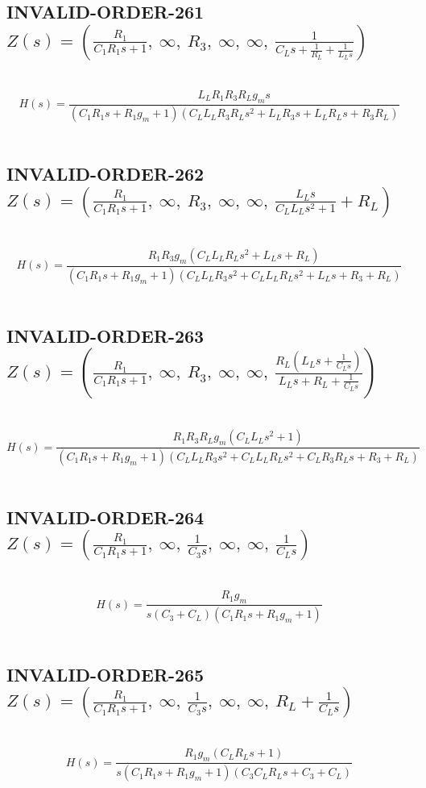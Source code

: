 \documentclass{article}
\begin{document}
\subsection{INVALID-ORDER-261 $Z(s) = \left( \frac{R_{1}}{C_{1} R_{1} s + 1}, \  \infty, \  R_{3}, \  \infty, \  \infty, \  \frac{1}{C_{L} s + \frac{1}{R_{L}} + \frac{1}{L_{L} s}}\right)$ } \ 
\textbf{\[H(s) = \frac{L_{L} R_{1} R_{3} R_{L} g_{m} s}{\left(C_{1} R_{1} s + R_{1} g_{m} + 1\right) \left(C_{L} L_{L} R_{3} R_{L} s^{2} + L_{L} R_{3} s + L_{L} R_{L} s + R_{3} R_{L}\right)}\] } \ 
\subsection{INVALID-ORDER-262 $Z(s) = \left( \frac{R_{1}}{C_{1} R_{1} s + 1}, \  \infty, \  R_{3}, \  \infty, \  \infty, \  \frac{L_{L} s}{C_{L} L_{L} s^{2} + 1} + R_{L}\right)$ } \ 
\textbf{\[H(s) = \frac{R_{1} R_{3} g_{m} \left(C_{L} L_{L} R_{L} s^{2} + L_{L} s + R_{L}\right)}{\left(C_{1} R_{1} s + R_{1} g_{m} + 1\right) \left(C_{L} L_{L} R_{3} s^{2} + C_{L} L_{L} R_{L} s^{2} + L_{L} s + R_{3} + R_{L}\right)}\] } \ 
\subsection{INVALID-ORDER-263 $Z(s) = \left( \frac{R_{1}}{C_{1} R_{1} s + 1}, \  \infty, \  R_{3}, \  \infty, \  \infty, \  \frac{R_{L} \left(L_{L} s + \frac{1}{C_{L} s}\right)}{L_{L} s + R_{L} + \frac{1}{C_{L} s}}\right)$ } \ 
\textbf{\[H(s) = \frac{R_{1} R_{3} R_{L} g_{m} \left(C_{L} L_{L} s^{2} + 1\right)}{\left(C_{1} R_{1} s + R_{1} g_{m} + 1\right) \left(C_{L} L_{L} R_{3} s^{2} + C_{L} L_{L} R_{L} s^{2} + C_{L} R_{3} R_{L} s + R_{3} + R_{L}\right)}\] } \ 
\subsection{INVALID-ORDER-264 $Z(s) = \left( \frac{R_{1}}{C_{1} R_{1} s + 1}, \  \infty, \  \frac{1}{C_{3} s}, \  \infty, \  \infty, \  \frac{1}{C_{L} s}\right)$ } \ 
\textbf{\[H(s) = \frac{R_{1} g_{m}}{s \left(C_{3} + C_{L}\right) \left(C_{1} R_{1} s + R_{1} g_{m} + 1\right)}\] } \ 
\subsection{INVALID-ORDER-265 $Z(s) = \left( \frac{R_{1}}{C_{1} R_{1} s + 1}, \  \infty, \  \frac{1}{C_{3} s}, \  \infty, \  \infty, \  R_{L} + \frac{1}{C_{L} s}\right)$ } \ 
\textbf{\[H(s) = \frac{R_{1} g_{m} \left(C_{L} R_{L} s + 1\right)}{s \left(C_{1} R_{1} s + R_{1} g_{m} + 1\right) \left(C_{3} C_{L} R_{L} s + C_{3} + C_{L}\right)}\] } \ 
\end{document}
